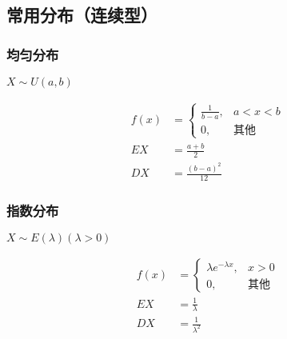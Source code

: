 \documentclass[UTF8]{ctexart}
\theoremstyle{remark}
\begin{document}
		\subsection{常用分布（连续型）}
		\subsubsection{均匀分布}
		\(X \sim U(a, b)\)
		
		\begin{align*}
			f(x) &= 
			\begin{cases}
				\frac{1}{b - a}, & a < x < b\\
				0, & \text{其他}
			\end{cases}\\
			EX &= \frac{a + b}{2}\\
			DX &= \frac{(b - a)^2}{12}
		\end{align*}
		
		\subsubsection{指数分布}
		\(X \sim E(\lambda) (\lambda > 0)\)
		
		\begin{align*}
			f(x) &= 
			\begin{cases}
				\lambda e^{-\lambda x}, & x > 0\\
				0, & \text{其他}
			\end{cases}\\
			EX &= \frac{1}{\lambda}\\
			DX &= \frac{1}{\lambda^2}
		\end{align*}
		
\end{document}
